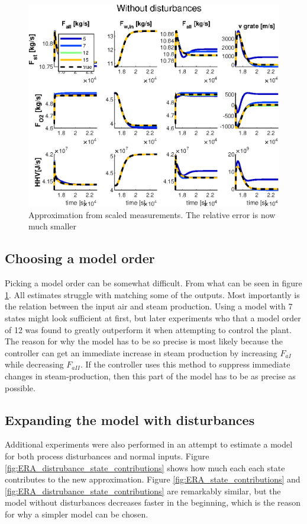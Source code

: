 \begin{figure}
    \centering
    \includegraphics[width=\textwidth]{img/Fig_dump/ERA_step_approx_without_disturbance_inputs.eps}
    \caption{Approximation from scaled measurements. The relative error is now much smaller}
    \label{fig:proper_system_approx}
\end{figure}

\subsection{Choosing a model order}
Picking a model order can be somewhat difficult. From what can be seen in figure \ref{fig:proper_system_approx}. All estimates struggle with matching some of the outputs. Most importantly is the relation between the input air and steam production. Using a model with 7 states might look sufficient at first, but later experiments who that  a model order of 12 was found to greatly outperform it when attempting to control the plant. The reason for why the model has to be so precise is most likely because the controller can get an immediate increase in steam production by increasing $F_{aI}$ while decreasing  $F_{aII}$. If the controller uses this method to suppress immediate changes in steam-production, then this part of the model has to be as precise as possible. 

\subsection{Expanding the model with disturbances}
\todo[inline]{}
Additional experiments were also performed in an attempt to estimate a model for both process disturbances and normal inputs. Figure \ref{fig:ERA_distrubance_state_contributions} shows how much each each state contributes to the new approximation. Figure \ref{fig:ERA_state_contributions} and \ref{fig:ERA_distrubance_state_contributions} are remarkably similar, but the model without disturbances decreases faster in the beginning, which is the reason for why a simpler model can be chosen. 


